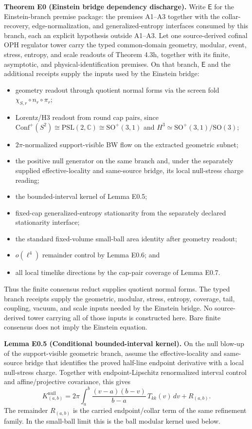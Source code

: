 \textbf{Theorem E0 (Einstein bridge dependency discharge).} Write \(\mathsf{E}\) for the Einstein-branch premise package: the premises A1--A3 together with the collar-recovery, edge-normalization, and generalized-entropy interfaces consumed by this branch, each an explicit hypothesis outside A1--A3. Let one source-derived cofinal OPH regulator tower carry the typed common-domain geometry, modular, event, stress, entropy, and scale readouts of Theorem 4.3h, together with its finite, asymptotic, and physical-identification premises. On that branch, \(\mathsf{E}\) and the additional receipts supply the inputs used by the Einstein bridge:

\begin{itemize}
\tightlist
\item
  geometry readout through quotient normal forms via the screen fold \(\chi_{S,r}\circ n_r\circ\pi_r\);
\item
  Lorentz/H3 readout from round cap pairs, since \(\mathrm{Conf}^+(S^2)\cong \mathrm{PSL}(2,\mathbb C)\cong \mathrm{SO}^+(3,1)\) and \(H^3\simeq\mathrm{SO}^+(3,1)/\mathrm{SO}(3)\);
\item
  \(2\pi\)-normalized support-visible BW flow on the extracted geometric subnet;
\item
  the positive null generator on the same branch and, under the separately supplied effective-locality and same-source bridge, its local null-stress charge reading;
\item
  the bounded-interval kernel of Lemma E0.5;
\item
  fixed-cap generalized-entropy stationarity from the separately declared stationarity interface;
\item
  the standard fixed-volume small-ball area identity after geometry readout;
\item
  \(o(\ell^4)\) remainder control by Lemma E0.6; and
\item
  all local timelike directions by the cap-pair coverage of Lemma E0.7.
\end{itemize}

Thus the finite consensus reduct supplies quotient normal forms. The typed branch receipts supply the geometric, modular, stress, entropy, coverage, tail, coupling, vacuum, and scale inputs needed by the Einstein bridge. No source-derived tower carrying all of those inputs is constructed here. Bare finite consensus does not imply the Einstein equation.

\textbf{Lemma E0.5 (Conditional bounded-interval kernel).} On the null blow-up of the support-visible geometric branch, assume the effective-locality and same-source bridge that identifies the proved half-line endpoint derivative with a local null-stress charge.  Together with endpoint-Lipschitz renormalized interval control and affine/projective covariance, this gives
\[
K_{(a,b)}^{\mathrm{null}}
=2\pi\int_a^b \frac{(v-a)(b-v)}{b-a}\,T_{kk}(v)\,dv
+R_{(a,b)} .
\]
The remainder \(R_{(a,b)}\) is the carried endpoint/collar term of the same refinement family. In the small-ball limit this is the ball modular kernel used below.

